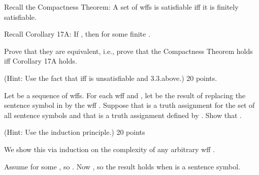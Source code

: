 	\page
	\startexercise [title={Compactness}]

		Recall the Compactness Theorem: A set of wffs is satisfiable iff it is finitely satisfiable.
	
		Recall Corollary 17A: If , then  for some finite .
	
		Prove that they are equivalent, i.e., prove that the Compactness Theorem holds iff Corollary 17A holds.

		(Hint: Use the fact that  iff  is unsatisfiable and 3.3.\in[satisfiability] above.) 20 points.
	\stopexercise

	
	\startexercise [title={Substitution}]
		Let  be a sequence of wffs. For each wff  and , let  be the result of replacing the sentence symbol  in  by the wff . Suppose that  is a truth assignment for the set of all sentence symbols and that  is a truth assignment defined by . Show that . 

		(Hint: Use the induction principle.)  20 points
	\stopexercise

	\startsolution
		We show this via induction on the complexity of any arbitrary wff .
		\startitemize [1]
			
			\item  {}  \qquad
				Assume  for some , so . Now , so the result holds when  is a sentence symbol.

